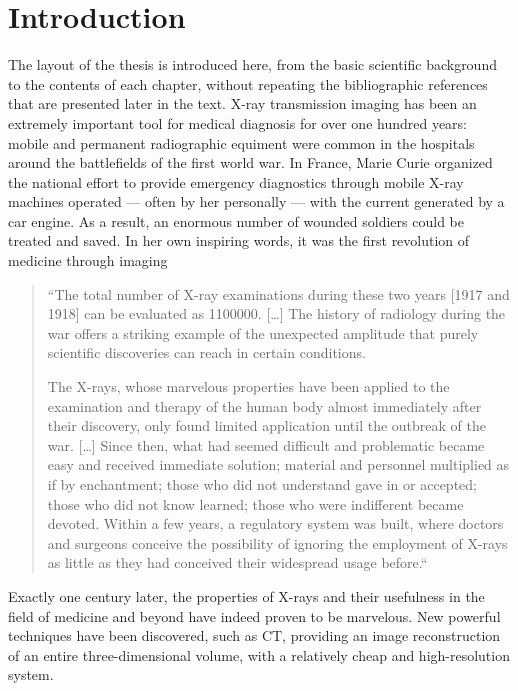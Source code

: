 \chapter{Introduction}\label{ch:introduction}
The layout of the thesis is introduced here, from the basic scientific
background to the contents of each chapter, without repeating the
bibliographic references that are presented later in the text.
X-ray transmission imaging has been an extremely important tool for medical
diagnosis for over one hundred years: mobile and permanent radiographic
equiment were common in the hospitals around the battlefields of the first
world war. In France, Marie Curie organized the national effort to
provide emergency diagnostics through mobile X-ray machines operated ---
often by her personally --- with the current generated by a car engine. As a
result, an enormous number of wounded soldiers could be treated and saved.
In her own inspiring words, it was the first revolution of medicine through
imaging
\begin{quote}
    ``The total number of X-ray examinations during these two years [1917 and
    1918] can be evaluated as \num{1100000}. [\ldots]
    The history of radiology during the war offers a striking example of the
    unexpected amplitude that purely scientific discoveries can reach in
    certain conditions.

    The X-rays, whose marvelous properties have been applied to the
    examination and therapy of the human body almost immediately after their
    discovery, only found limited application until the outbreak of the war.
    [\ldots] Since then, what had seemed difficult and problematic became
    easy and received immediate solution; material and personnel
    multiplied as if by enchantment; those who did not understand gave in or
    accepted; those who did not know learned; those who were indifferent
    became devoted. Within a few years, a regulatory system was built, where
    doctors and surgeons conceive the possibility of ignoring the employment of
    X-rays as little as they had conceived their widespread usage
    before.``~\parencite{Curie1921}
\end{quote}

Exactly one century later, the properties of X-rays and their usefulness in
the field of medicine and beyond have indeed proven to be marvelous. 
New powerful techniques have been discovered, such as \ac{CT}, providing an
image reconstruction of an entire three-dimensional volume, with a
relatively cheap and high-resolution system.

